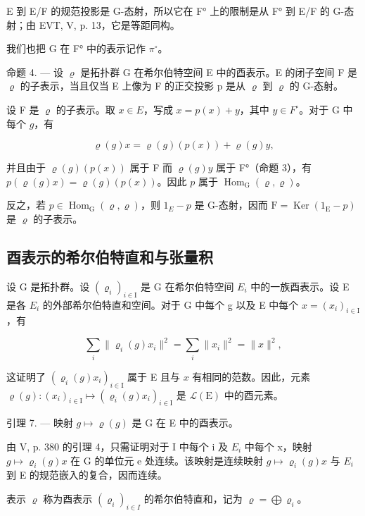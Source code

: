 E 到 E/F 的规范投影是 G-态射，所以它在 F° 上的限制是从 F° 到 E/F 的 G-态射；由 EVT, V, p. 13，它是等距同构。

我们也把 G 在 F° 中的表示记作 \(\pi^{\circ}\)。

命题 4. --- 设 \(\varrho\) 是拓扑群 G 在希尔伯特空间 E 中的酉表示。E 的闭子空间 F 是 \(\varrho\) 的子表示，当且仅当 E 上像为 F 的正交投影 p 是从 \(\varrho\) 到 \(\varrho\) 的 G-态射。

设 F 是 \(\varrho\) 的子表示。取 \(x \in E\)，写成 \(x = p(x) + y\)，其中 \(y \in F^{\circ}\)。对于 G 中每个 \(g\)，有

\[
\varrho (g) x = \varrho (g) (p (x)) + \varrho (g) y,
\]

并且由于 \(\varrho(g)(p(x))\) 属于 F 而 \(\varrho(g)y\) 属于 F°（命题 3），有 \(p(\varrho(g)x) = \varrho(g)(p(x))\)。因此 \(p\) 属于 \(\operatorname{Hom}_{\mathrm{G}}(\varrho, \varrho)\)。

反之，若 \(p \in \operatorname{Hom}_{\mathrm{G}}(\varrho, \varrho)\)，则 \(1_{E} - p\) 是 G-态射，因而 \(\mathrm{F} = \operatorname{Ker}(1_{\mathrm{E}} - p)\) 是 \(\varrho\) 的子表示。

\subsection{酉表示的希尔伯特直和与张量积}

设 G 是拓扑群。设 \((\varrho_{i})_{i\in\mathrm{I}}\) 是 G 在希尔伯特空间 \(E_{i}\) 中的一族酉表示。设 E 是各 \(E_{i}\) 的外部希尔伯特直和空间。对于 G 中每个 g 以及 E 中每个 \(x=(x_{i})_{i\in\mathrm{I}}\)，有

\[
\sum_ {i} \| \varrho_ {i} (g) x _ {i} \| ^ {2} = \sum_ {i} \| x _ {i} \| ^ {2} = \| x \| ^ {2},
\]

这证明了 \((\varrho_i(g)x_i)_{i\in \mathrm{I}}\) 属于 E 且与 \(x\) 有相同的范数。因此，元素 \(\varrho (g)\colon (x_{i})_{i\in \mathrm{I}}\mapsto (\varrho_{i}(g)x_{i})_{i\in \mathrm{I}}\) 是 \(\mathcal{L}(\mathrm{E})\) 中的酉元素。

引理 7. --- 映射 \(g \mapsto \varrho(g)\) 是 G 在 E 中的酉表示。

由 V, p. 380 的引理 4，只需证明对于 I 中每个 i 及 \(E_{i}\) 中每个 x，映射 \(g \mapsto \varrho_{i}(g)x\) 在 G 的单位元 e 处连续。该映射是连续映射 \(g \mapsto \varrho_{i}(g)x\) 与 \(E_{i}\) 到 E 的规范嵌入的复合，因而连续。

表示 \(\varrho\) 称为酉表示 \((\varrho_{i})_{i\in I}\) 的希尔伯特直和，记为 \(\varrho = \bigoplus \varrho_{i}\)。

